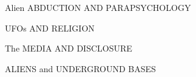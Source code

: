\documentclass{article}\usepackage[T1]{fontenc}\usepackage{graphicx}
\begin{document}
\selectfont
{\fontsize{26}{30}\selectfont Alien ABDUCTION {\fontsize{20}{20}\selectfont AND} PARAPSYCHOLOGY\par}
\vspace{10pt}
{\fontsize{26}{30}\selectfont UFOs {\fontsize{20}{20}\selectfont AND} RELIGION\par}
\vspace{10pt}
{\fontsize{26}{30}\selectfont The MEDIA {\fontsize{20}{20}\selectfont AND} DISCLOSURE\par}
\vspace{10pt}
{\fontsize{26}{30}\selectfont ALIENS and UNDERGROUND BASES\par}
\end{document}
